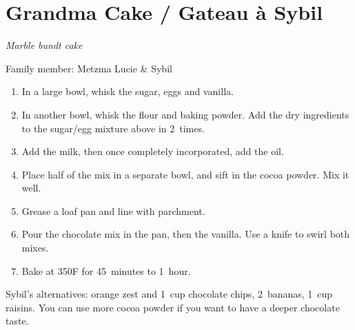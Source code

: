 \chapter{Grandma Cake / Gateau à Sybil}
\label{ch:grandma_cake}


\textit{Marble bundt cake}

Family member: Metzma Lucie \& Sybil

\begin{enumerate}
    \item In a large bowl, whisk the sugar, eggs and vanilla.
    \item In another bowl, whisk the flour and baking powder. Add the dry ingredients to the sugar/egg mixture above in 2~times.
    \item Add the milk, then once completely incorporated, add the oil.
    \item Place half of the mix in a separate bowl, and sift in the cocoa powder. Mix it well.
    \item Grease a loaf pan and line with parchment.
    \item Pour the chocolate mix in the pan, then the vanilla. Use a knife to swirl both mixes.
    \item Bake at 350\degree F for 45~minutes to 1~hour.
\end{enumerate}


Sybil's alternatives: orange zest and 1~cup chocolate chips, 2~bananas, 1~cup raisins. You can use more cocoa powder if you want to have a deeper chocolate taste.
